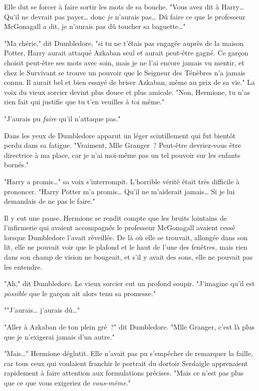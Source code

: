Elle dut se forcer à faire sortir les mots de sa bouche. "Vous avez dit à Harry… Qu'il ne devrait pas payer… donc \emph{je} n'aurais pas… Dû faire ce que le professeur McGonagall a dit, je n'aurais pas dû toucher sa baguette…"

"Ma chérie," dit Dumbledore, "si tu ne t'étais pas engagée auprès de la maison Potter, Harry aurait attaqué Azkaban seul et aurait peut-être gagné. Ce garçon choisit peut-être ses mots avec soin, mais je ne l'ai encore jamais vu mentir, et chez le Survivant se trouve un pouvoir que le Seigneur des Ténèbres n'a jamais connu. Il aurait bel et bien essayé de briser Azkaban, même au prix de sa vie." La voix du vieux sorcier devint plus douce et plus amicale. "Non, Hermione, tu n'as rien fait qui justifie que tu t'en veuilles à toi même."

"J'aurais pu \emph{faire} qu'il n'attaque pas."

Dans les yeux de Dumbledore apparut un léger scintillement qui fut bientôt perdu dans sa fatigue. "Vraiment, Mlle Granger~? Peut-être devriez-vous être directrice à ma place, car je n'ai moi-même pas un tel pouvoir sur les enfants bornés."

"Harry a promis…" sa voix s'interrompit. L'horrible vérité était très difficile à prononcer. "Harry Potter m'a promis… Qu'il ne m'aiderait jamais… Si je lui demandais de ne pas le faire."

Il y eut une pause. Hermione se rendit compte que les bruits lointains de l'infirmerie qui avaient accompagnés le professeur McGonagall avaient cessé lorsque Dumbledore l'avait réveillée. De là où elle se trouvait, allongée dans son lit, elle ne pouvait voir que le plafond et le haut de l'une des fenêtres, mais rien dans son champ de vision ne bougeait, et s'il y avait des sons, elle ne pouvait pas les entendre.

"Ah," dit Dumbledore. Le vieux sorcier eut un profond soupir. "J'imagine qu'il est \emph{possible} que le garçon ait alors tenu sa promesse."

""J'aurais… j'aurais dû…"

"Aller à Azkaban de ton plein gré~?" dit Dumbledore. "Mlle Granger, c'est là plus que je n'exigerai jamais d'un autre."

"Mais…" Hermione déglutit. Elle n'avait pas pu s'empêcher de remarquer la faille, car tous ceux qui voulaient franchir le portrait du dortoir Serdaigle apprenaient rapidement à faire attention aux formulations précises. "Mais ce n'est pas plus que ce que vous exigeriez de \emph{vous-même}."

